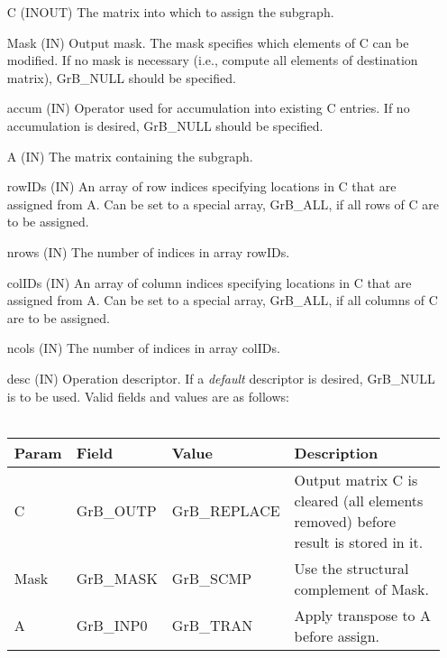 \begin{itemize}[leftmargin=1.1in]
    \item[{\sf C}]      ({\sf INOUT}) The matrix into which to assign the subgraph.
    \item[{\sf Mask}]   ({\sf IN}) Output mask. The mask specifies which elements
    of {\sf C} can be modified. If no mask is necessary (i.e., compute all
    elements of destination matrix), {\sf GrB\_NULL} should be specified.
    \item[{\sf accum}]  ({\sf IN}) Operator used for accumulation into existing {\sf C} entries.  If no accumulation
                        is desired, {\sf GrB\_NULL} should be specified.
    \item[{\sf A}]      ({\sf IN}) The matrix containing the subgraph.
    \item[{\sf rowIDs}] ({\sf IN}) An array of row indices specifying locations
                        in {\sf C} that are assigned from {\sf A}. Can be set to
                        a special array, {\sf GrB\_ALL}, if all rows of {\sf C}
                        are to be assigned.
    \item[{\sf nrows}]  ({\sf IN}) The number of indices in array {\sf rowIDs}.
    \item[{\sf colIDs}] ({\sf IN}) An array of column indices specifying locations 
                        in {\sf C} that are assigned from {\sf A}. Can be set to
                        a special array, {\sf GrB\_ALL}, if all columns of {\sf C}
                        are to be assigned.
    \item[{\sf ncols}]  ({\sf IN}) The number of indices in array {\sf colIDs}.
    \item[{\sf desc}]   ({\sf IN}) Operation descriptor. If a
    \emph{default} descriptor is desired, {\sf GrB\_NULL} is to be
    used. Valid fields and values are as follows: \\ ~\\
    \begin{tabular}{lllp{2.5in}}
    Param & Field  & Value & Description \\
    \hline
    {\sf C}    & {\sf GrB\_OUTP} & {\sf GrB\_REPLACE} &  Output matrix {\sf C} 
                                       is cleared (all elements removed) before 
                                       result is stored in it.\\
    {\sf Mask} & {\sf GrB\_MASK} & {\sf GrB\_SCMP}   & Use the structural complement of {\sf Mask}. \\
    {\sf A}    & {\sf GrB\_INP0} & {\sf GrB\_TRAN}   & Apply transpose to {\sf A} before assign. \\
    \end{tabular}
\end{itemize}

